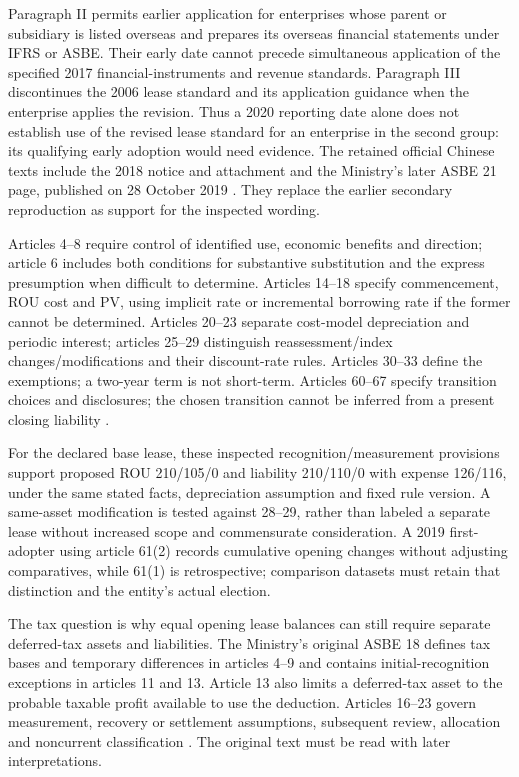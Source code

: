 Paragraph II permits earlier application for enterprises whose parent or subsidiary is listed overseas and prepares its overseas financial statements under IFRS or ASBE. Their early date cannot precede simultaneous application of the specified 2017 financial-instruments and revenue standards. Paragraph III discontinues the 2006 lease standard and its application guidance when the enterprise applies the revision. Thus a 2020 reporting date alone does not establish use of the revised lease standard for an enterprise in the second group: its qualifying early adoption would need evidence. The retained official Chinese texts include the 2018 notice and attachment and the Ministry's later ASBE 21 page, published on 28 October 2019 \citep{moflease2018,mofasbe21}. They replace the earlier secondary reproduction as support for the inspected wording.

Articles 4--8 require control of identified use, economic benefits and direction; article 6 includes both conditions for substantive substitution and the express presumption when difficult to determine. Articles 14--18 specify commencement, ROU cost and PV, using implicit rate or incremental borrowing rate if the former cannot be determined. Articles 20--23 separate cost-model depreciation and periodic interest; articles 25--29 distinguish reassessment/index changes/modifications and their discount-rate rules. Articles 30--33 define the exemptions; a two-year term is not short-term. Articles 60--67 specify transition choices and disclosures; the chosen transition cannot be inferred from a present closing liability \citep[attached standard, arts.\ 4--8, 14--33, 60--67]{moflease2018}.

For the declared base lease, these inspected recognition/measurement provisions support proposed ROU 210/105/0 and liability 210/110/0 with expense 126/116, under the same stated facts, depreciation assumption and fixed rule version. A same-asset modification is tested against 28--29, rather than labeled a separate lease without increased scope and commensurate consideration. A 2019 first-adopter using article 61(2) records cumulative opening changes without adjusting comparatives, while 61(1) is retrospective; comparison datasets must retain that distinction and the entity's actual election.

The tax question is why equal opening lease balances can still require separate deferred-tax assets and liabilities. The Ministry's original ASBE 18 defines tax bases and temporary differences in articles 4--9 and contains initial-recognition exceptions in articles 11 and 13. Article 13 also limits a deferred-tax asset to the probable taxable profit available to use the deduction. Articles 16--23 govern measurement, recovery or settlement assumptions, subsequent review, allocation and noncurrent classification \citep{mofasbe18}. The original text must be read with later interpretations.

